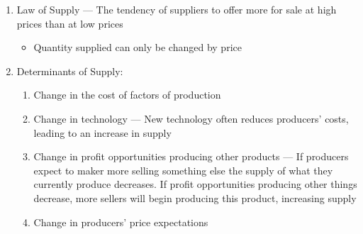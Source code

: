 \documentclass[12pt]{article}
\begin{document}
\begin{enumerate}
\begin{multicols}{2}
    \end{multicols}

  \item Law of Supply — The tendency of suppliers to offer more for sale at high prices than at low prices

    \begin{itemize}

      \item Quantity supplied can only be changed by price

    \end{itemize}

  \item Determinants of Supply:

    \begin{enumerate}

      \item Change in the cost of factors of production

      \item Change in technology — New technology often reduces producers' costs, leading to an increase in supply

      \item Change in profit opportunities producing other products — If producers expect to maker more selling something else the supply of what they currently produce decreases. If profit opportunities producing other things decrease, more sellers will begin producing this product, increasing supply

      \item Change in producers' price expectations

    \end{enumerate}

    \begin{center}
    \end{center}

\end{enumerate}
\end{document}
